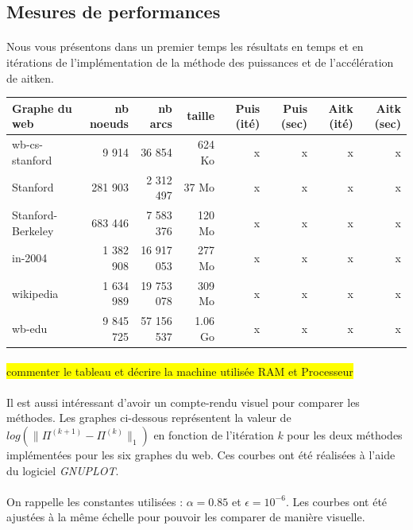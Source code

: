 	\subsection{Mesures de performances}
	
		\paragraph{}Nous vous présentons dans un premier temps les résultats en temps et en itérations de l'implémentation de la méthode des puissances et de l'accélération de aitken.
		
			\begin{center}\begin{tabular}{lrrrrrrr}
				\hline
				Graphe du web & nb noeuds & nb arcs & taille & Puis (ité) & Puis (sec) & Aitk (ité) & Aitk (sec) \\
				\hline
				wb-cs-stanford & 9 914 & 36 854 & 624 Ko & x & x & x & x \\
				Stanford & 281 903 & 2 312 497 & 37 Mo & x & x & x & x \\
				Stanford-Berkeley & 683 446 & 7 583 376 & 120 Mo & x & x & x & x \\
				in-2004 & 1 382 908 & 16 917 053 & 277 Mo & x & x & x & x \\
				wikipedia & 1 634 989 & 19 753 078 & 309 Mo & x & x & x & x \\
				wb-edu & 9 845 725 & 57 156 537 & 1.06 Go & x & x & x & x \\
				\hline
			\end{tabular}\end{center}
			
		\paragraph{}\colorbox{yellow}{commenter le tableau et décrire la machine utilisée RAM et Processeur}
		
		\paragraph{}Il est aussi intéressant d'avoir un compte-rendu visuel pour comparer les méthodes. Les graphes ci-dessous représentent la valeur de $log(\| \Pi^{(k + 1)} - \Pi^{(k)} \|_{1})$ en fonction de l'itération $k$ pour les deux méthodes implémentées pour les six graphes du web. Ces courbes ont été réalisées à l'aide du logiciel \textit{GNUPLOT}.
		\paragraph{}On rappelle les constantes utilisées : $\alpha = 0.85$ et $\epsilon = 10^{-6}$. Les courbes ont été ajustées à la même échelle pour pouvoir les comparer de manière visuelle.\\
		
